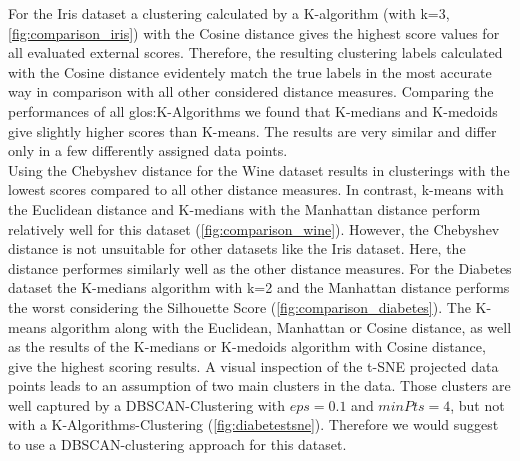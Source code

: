 For the Iris dataset a clustering calculated by a K-algorithm (with k=3, \autoref{fig:comparison_iris}) with the Cosine distance gives the highest score values for all evaluated external scores. Therefore, the resulting clustering labels calculated with the Cosine distance evidentely match the true labels in the most accurate way in comparison with all other considered distance measures. Comparing the performances of all \Gls{glos:K-Algorithms} we found that K-medians and K-medoids give slightly higher scores than K-means. The results are very similar and differ only in a few differently assigned data points. \\
Using the Chebyshev distance for the Wine dataset results in clusterings with the lowest scores compared to all other distance measures. In contrast, k-means with the Euclidean distance and K-medians with the Manhattan distance perform relatively well for this dataset (\autoref{fig:comparison_wine}). However, the Chebyshev distance is not unsuitable for other datasets like the Iris dataset. Here, the distance performes similarly well as the other distance measures.
For the Diabetes dataset the K-medians algorithm with k=2 and the Manhattan distance performs the worst considering the Silhouette Score (\autoref{fig:comparison_diabetes}). The K-means algorithm along with the Euclidean, Manhattan or Cosine distance, as well as the results of the K-medians or K-medoids algorithm with Cosine distance, give the highest scoring results. A visual inspection of the t-SNE projected data points leads to an assumption of two main clusters in the data. Those clusters are well captured by a DBSCAN-Clustering with $eps = 0.1$ and $minPts = 4$, but not with a K-Algorithms-Clustering (\autoref{fig:diabetestsne}). Therefore we would suggest to use a DBSCAN-clustering approach for this dataset. 

